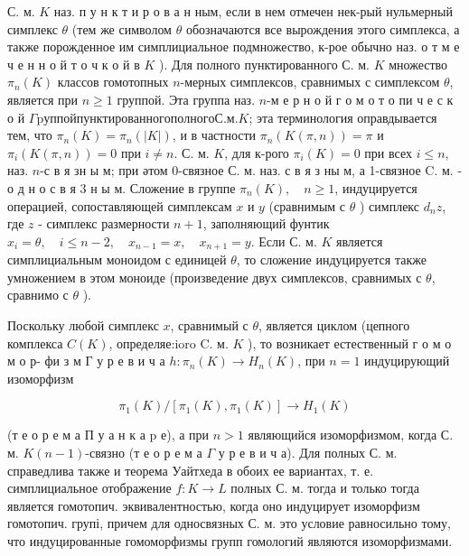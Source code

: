 \documentclass[10pt]{article}
\begin{document}
С. м. $K$ наз. п у н к т и р о в а н ным, если в нем отмечен нек-рый нульмерный симплекс $\theta$ (тем же символом $\theta$ обозначаются все вырождения этого симплекса, а также порожденное им симплициальное подмножество, к-рое обычно наз. о т м е ч е н н о й т о ч к о й в $K$ ). Для полного пунктированного С. м. $K$ множество $\pi_{n}(K)$ классов гомотопных $n$-мерных симплексов, сравнимых с симплексом $\theta$, является при $n \geqslant 1$ группой. Эта группа наз. $n$-м е р н о й г о м о т о пи ч е с к о й $\Gamma \mathrm{p} \mathrm{у} \mathrm{п} \mathrm{п} \mathrm{о} \mathrm{й} \mathrm{пунктированного} \mathrm{полного} \mathrm{С.} \mathrm{м.} K$; эта терминология оправдывается тем, что $\pi_{n}(K)=\pi_{n}(|K|)$, и в частности $\pi_{n}(K(\pi, n))=\pi$ и $\pi_{i}(K(\pi, n))=0$ при $i \neq n$. С. м. $K$, для к-рого $\pi_{i}(K)=0$ при всех $i \leqslant n$, наз. $n$-с в я зн ы м; при әтом 0-связное С. м. наз. с в я з ны м, а 1-связное C. м. - о д н о с в я 3 н ы м. Сложение в группе $\pi_{n}(K), \quad n \geqslant 1$, индуцируется операцией, сопоставляющей симплексам $x$ и $y$ (сравнимым с $\theta$ ) симплекс $d_{n} z$, где $z$ - симплекс размерности $n+1$, заполняющий фунтик $x_{i}=\theta, \quad i \leqslant n-2, \quad x_{n-1}=x, \quad x_{n+1}=y$. Если С. м. $K$ является симплициальным моноидом с единицей $\theta$, то сложение индуцируется также умножением в этом моноиде (произведение двух симплексов, сравнимых с $\theta$, сравнимо с $\theta$ ).



Поскольку любой симплекс $x$, сравнимый с $\theta$, является циклом (цепного комплекса $C(K)$, определяе:ioro C. м. $K$ ), то возникает естественный г о м о м о р- фи з м Г у р е в и ч а $h: \pi_{n}(K) \rightarrow H_{n}(K)$, при $n=1$ индуцирующий изоморфизм



\[

\pi_{1}(K) /\left[\pi_{1}(K), \pi_{1}(K)\right] \longrightarrow H_{1}(K)

\]



(т е о р е м а П у а н к а $\mathrm{p}$ е), а при $n>1$ являющийся изоморфизмом, когда С. м. $K(n-1)$-связно (т е о р е м а $\Gamma$ у р е в и ч а). Для полных С. м. справедлива также и теорема Уайтхеда в обоих ее вариантах, т. е. симплициальное отображение $f: K \rightarrow L$ полных С. м. тогда и только тогда является гомотопич. эквивалентностью, когда оно индуцирует изоморфизм гомотопич. групі, причем для односвязных С. м. это условие равносильно тому, что индуцированные гомоморфизмы групп гомологий являются изоморфизмами.
\end{document}
